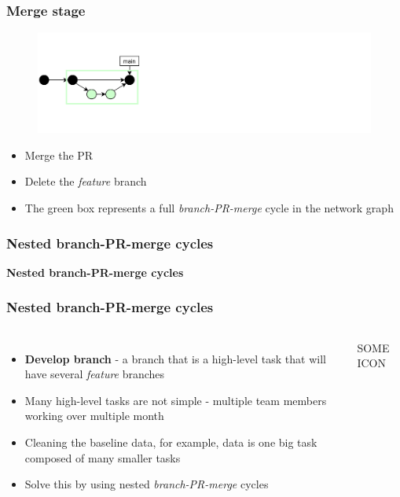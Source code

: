 \documentclass[aspectratio=169]{beamer} %
\begin{document}
\begin{frame}
	\frametitle{Merge stage}

	\vspace{-.5cm}
	\begin{minipage}[t][5cm][t]{\textwidth}
		\begin{figure}
			\centering
			\includegraphics[width=\textwidth]{./img/dime-gitflow-network-1-3.png}
		\end{figure}
	\end{minipage}

	\vspace{-.5cm}
	\begin{minipage}[t][5cm][t]{\textwidth}
		\begin{itemize}
			\setlength\itemsep{.5em}
			\item Merge the PR
			\item Delete the \textit{feature} branch
			\item The green box represents a full \textit{branch-PR-merge} cycle in the network graph
		\end{itemize}
	\end{minipage}

\end{frame}

\begin{frame}
	\frametitle{Nested branch-PR-merge cycles}

	\huge\centering \textbf{Nested branch-PR-merge cycles}

\end{frame}

\begin{frame}
	\frametitle{Nested branch-PR-merge cycles}
	\begin{columns}[c]

		\begin{itemize}
			\setlength\itemsep{.5em}
			\item \textbf{Develop branch} - a branch that is a high-level task that will have several \textit{feature} branches
			\item Many high-level tasks are not simple - multiple team members working over multiple month
			\item Cleaning the baseline data, for example, data is one big task composed of many smaller tasks
			\item Solve this by using nested \textit{branch-PR-merge} cycles
		\end{itemize}

		\vspace{-.75cm}
		\Large SOME ICON
	\end{columns}
\end{frame}
\end{document}
